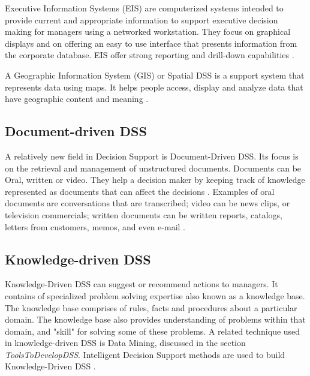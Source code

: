 \indent Executive Information Systems (EIS) are computerized systems intended to provide current and appropriate information to support executive decision making for managers using a networked workstation. They focus on graphical displays and on offering an easy to use interface that presents information from the corporate database. EIS offer strong reporting and drill-down capabilities \cite{DDSTypes}.

\indent A Geographic Information System (GIS) or Spatial DSS is a support system that represents data using maps. It helps people access, display and analyze data that have geographic content and meaning \cite{DDSTypes}.
\subsection{Document-driven DSS}
\label{subsec:DocumentDrivenDSS}
A relatively new field in Decision Support is Document-Driven DSS. Its focus is on the retrieval and management of unstructured documents. Documents can be Oral, written or video. They help a decision maker by keeping track of knowledge represented as documents that can affect the decisions \cite{power2002building}. Examples of oral documents are conversations that are transcribed; video can be news clips, or television commercials; written documents can be written reports, catalogs, letters from customers, memos, and even e-mail \cite{DDSTypes}.
\subsection{Knowledge-driven DSS}
\label{subsec:KnowledgeDrivenDSS}
Knowledge-Driven DSS can suggest or recommend actions to managers. It contains of specialized problem solving expertise also known as a knowledge base. The knowledge base comprises of rules, facts and procedures about a particular domain. The knowledge base also provides understanding of problems within that domain, and "skill" for solving some of these problems. A related technique used in knowledge-driven DSS is Data Mining, discussed in the section \textit{ToolsToDevelopDSS}. Intelligent Decision Support methods are used to build Knowledge-Driven DSS \cite{power2002building}.
